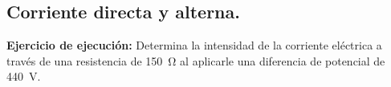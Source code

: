 \documentclass[12pt]{exam}
\begin{document}
\begin{questions}

    

    \setcounter{section}{10}
    \section{Corriente directa y alterna.}

    \setcounter{question}{25} \question \textbf{Ejercicio de ejecución:} Determina la intensidad de la corriente eléctrica a través de una resistencia de \SI{150}{\ohm} al aplicarle una diferencia de potencial de \SI{440}{\volt}.


\end{questions}
\end{document}
